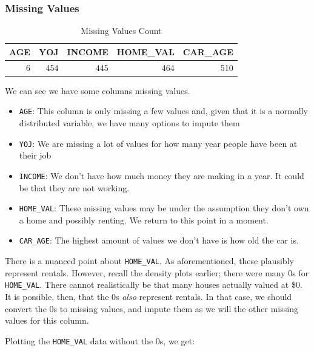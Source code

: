\documentclass[
]{article}
\providecommand{\tightlist}{%
  \setlength{\itemsep}{0pt}\setlength{\parskip}{0pt}}
\begin{document}
\subsubsection{Missing Values}\label{missing-values}

\begin{table}[H]
\centering\centering
\caption{\label{tab:missing-values}Missing Values Count}
\centering
\begin{tabular}[t]{r|r|r|r|r}
\hline
AGE & YOJ & INCOME & HOME\_VAL & CAR\_AGE\\
\hline
6 & 454 & 445 & 464 & 510\\
\hline
\end{tabular}
\end{table}

We can see we have some columns missing values.

\begin{itemize}
\tightlist
\item
  \texttt{AGE}: This column is only missing a few values and, given that
  it is a normally distributed variable, we have many options to impute
  them
\item
  \texttt{YOJ}: We are missing a lot of values for how many year people
  have been at their job
\item
  \texttt{INCOME}: We don't have how much money they are making in a
  year. It could be that they are not working.
\item
  \texttt{HOME\_VAL}: These missing values may be under the assumption
  they don't own a home and possibly renting. We return to this point in
  a moment.
\item
  \texttt{CAR\_AGE}: The highest amount of values we don't have is how
  old the car is.
\end{itemize}

There is a nuanced point about \texttt{HOME\_VAL}. As aforementioned,
these plausibly represent rentals. However, recall the density plots
earlier; there were many 0s for \texttt{HOME\_VAL}. There cannot
realistically be that many houses actually valued at \$0. It is
possible, then, that the 0s \emph{also} represent rentals. In that case,
we should convert the 0s to missing values, and impute them as we will
the other missing values for this column.

Plotting the \texttt{HOME\_VAL} data without the 0s, we get:
\end{document}
